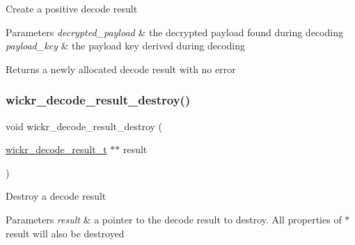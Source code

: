 Create a positive decode result


\begin{DoxyParams}{Parameters}
{\em decrypted\+\_\+payload} & the decrypted payload found during decoding \\
\hline
{\em payload\+\_\+key} & the payload key derived during decoding \\
\hline
\end{DoxyParams}
\begin{DoxyReturn}{Returns}
a newly allocated decode result with no error 
\end{DoxyReturn}
\mbox{\label{group__wickr__protocol_ga94154ab44a6c2e9b97a115e37416efe1}} 
\subsubsection{\texorpdfstring{wickr\+\_\+decode\+\_\+result\+\_\+destroy()}{wickr\_decode\_result\_destroy()}}
{\footnotesize\ttfamily void wickr\+\_\+decode\+\_\+result\+\_\+destroy (\begin{DoxyParamCaption}\item[{\hyperlink{structwickr__decode__result}{wickr\+\_\+decode\+\_\+result\+\_\+t} $\ast$$\ast$}]{result }\end{DoxyParamCaption})}

Destroy a decode result


\begin{DoxyParams}{Parameters}
{\em result} & a pointer to the decode result to destroy. All properties of \textquotesingle{}$\ast$result\textquotesingle{} will also be destroyed \\
\hline
\end{DoxyParams}
\mbox{\label{group__wickr__protocol_ga32d9da2e10d1d653b2ac894d50aaedb0}} 
